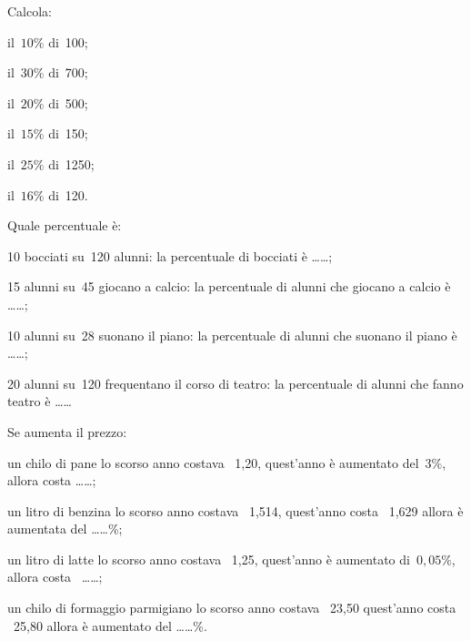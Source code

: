 
\begin{esercizio}
\label{ese:3.90}
Calcola:
\begin{multicols}{3}
\begin{enumeratea}
\item il~$10\%$ di~100;
\item il~$30\%$ di~700;
\item il~$20\%$ di~500;
\item il~$15\%$ di~150;
\item il~$25\%$ di~1250;
\item il~$16\%$ di~120.
\end{enumeratea}
\end{multicols}
\end{esercizio}

\begin{esercizio}
 \label{ese:3.91}
Quale percentuale è:
\begin{enumeratea}
 \item 10 bocciati su~120 alunni: la percentuale di bocciati è \ldots\ldots;
 \item 15 alunni su~45 giocano a calcio: la percentuale di alunni che giocano 
 a calcio è \ldots\ldots;
 \item 10 alunni su~28 suonano il piano: la percentuale di alunni che suonano 
 il piano è \ldots\ldots;
 \item 20 alunni su~120 frequentano il corso di teatro: la percentuale di 
 alunni che fanno teatro è \ldots\ldots
\end{enumeratea}
\end{esercizio}

\begin{esercizio}
 \label{ese:3.92}
Se aumenta il prezzo:
\begin{enumeratea}
 \item un chilo di pane lo scorso anno costava \officialeuro\ 1,20, quest'anno 
 è aumentato del~$3\%$, allora costa
\ldots\ldots;
 \item un litro di benzina lo scorso anno costava \officialeuro\ 1,514, 
 quest'anno costa \officialeuro\ 1,629
 allora è aumentata del \ldots\ldots\%;
 \item un litro di latte lo scorso anno costava \officialeuro\ 1,25, 
 quest'anno è aumentato di~$0,05\%$,
allora costa \officialeuro\ \ldots\ldots;
 \item un chilo di formaggio parmigiano lo scorso anno costava 
 \officialeuro\ 23,50 quest'anno costa \officialeuro\ 25,80
allora è aumentato del \ldots\ldots\%.
\end{enumeratea}
\end{esercizio}

